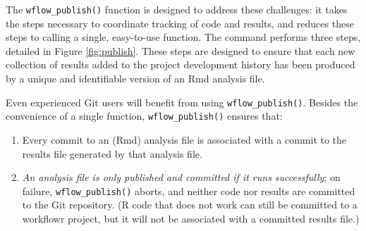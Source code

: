 \documentclass[9pt,a4paper]{extarticle}
\begin{document}
The \texttt{wflow\_publish()} function is designed to address these challenges: it
takes the steps necessary to coordinate tracking of code and results,
and reduces these steps to calling a single, easy-to-use function. The
command performs three steps, detailed in Figure \ref{fig:publish}. These steps are
designed to ensure that each new collection of results added to the
project development history has been produced by a unique and
identifiable version of an Rmd analysis file.

Even experienced Git users will benefit from using \texttt{wflow\_publish()}.
Besides the convenience of a single function, \texttt{wflow\_publish()} ensures
that:

\begin{enumerate}

\item Every commit to an (Rmd) analysis file is associated with a commit
to the results file generated by that analysis file.

\item \textit{An analysis file is only published and committed if it
runs successfully}; on failure, \texttt{wflow\_publish()} aborts, and neither code
nor results are committed to the Git repository. (R code that does not
work can still be committed to a workflowr project, but it will not be
associated with a committed results file.)

\end{enumerate}
\end{document}
